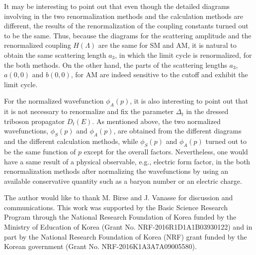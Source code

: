 \documentclass[jkps,preprint,fleqn,showpacs,showkeys]{revtex4}
\begin{document}
It may be interesting to point out that even though the detailed diagrams
involving in the two renormalization methods and the calculation methods
are different, the results
of the renormalization of the coupling constants turned out to be the same.
Thus, because the diagrams for the scattering amplitude
and the renormalized coupling $H(\Lambda)$ are the same for SM and AM,
it is natural to obtain the same scattering length $a_3$, in which the
limit cycle is renormalized, for the both methods.
On the other hand, the parts of the
scattering lengths $a_3$, $a(0,0)$ and $b(0,0)$, for AM are indeed
sensitive to the cutoff and exhibit the limit cycle.

For the normalized wavefunction $\phi_A(p)$, 
it is also interesting to point out
that it is not necessary to renormalize and fix the parameter $\Delta_t$
in the dressed triboson propagator $D_t(E)$. 
%
As mentioned above, the two normalized wavefunctions,
$\phi_S(p)$ and $\phi_A(p)$, are obtained from the different diagrams
and the different calculation methods,
while $\phi_S(p)$ and $\phi_A(p)$ turned out to be the same function of $p$
except for the overall factors.
%
Nevertheless, one would have a same result of a physical observable,
e.g., electric form factor, in the both renormalization methods
after normalizing the wavefunctions by using an available conservative
quantity such as a baryon number or an electric charge.


\begin{acknowledgments}
The author would like to thank M. Birse and J. Vanasse for
discussion and communications.
%
This work was supported by
the Basic Science Research Program through the National Research
Foundation of Korea funded by the Ministry of Education of Korea
(Grant No. NRF-2016R1D1A1B03930122)
%
and in part by
the National Research Foundation of Korea (NRF)
grant funded by the Korean government
(Grant No. NRF-2016K1A3A7A09005580).
\end{acknowledgments}
\end{document}
